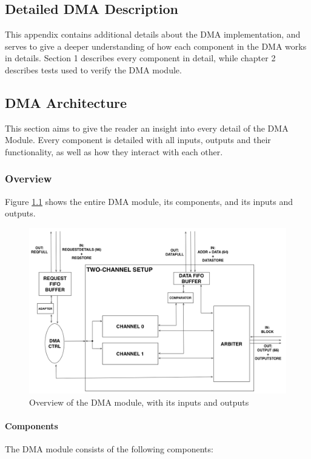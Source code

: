 \begin{appendix}

\chapter{Detailed DMA Description}
\label{app:DMA-arch}
This appendix contains additional details about the DMA implementation, and serves to give a deeper understanding of how each component in the DMA works in details.
Section 1 describes every component in detail, while chapter 2 describes tests used to verify the DMA module.

\section{DMA Architecture}
This section aims to give the reader an insight into every detail of the DMA Module.
Every component is detailed with all inputs, outputs and their functionality, as well as how they interact with each other.

\subsection{Overview}
Figure \ref{fig:TopViewFinalSimple2IO} shows the entire DMA module, its components, and its inputs and outputs.

\begin{figure}[htb]
    \centering
    \includegraphics[width=1.0\textwidth]{Figures/DMA/TopViewFinalSimple2IO}
    \caption{Overview of the DMA module, with its inputs and outputs}
    \label{fig:TopViewFinalSimple2IO}
\end{figure}

\subsubsection{Components}
The DMA module consists of the following components:


\end{appendix}
